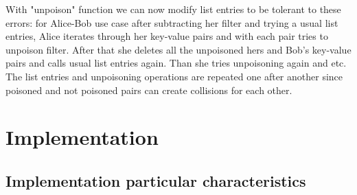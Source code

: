 \documentclass{article}
\begin{document}
With "unpoison" function we can now modify list entries to be tolerant to these 
errors: for Alice-Bob use case after subtracting her filter and trying a usual 
list entries, Alice iterates through her key-value pairs and with each pair tries
to unpoison filter. After that she deletes all the unpoisoned hers and Bob's 
key-value pairs and calls usual list entries again. Than she tries unpoisoning 
again and etc. The list entries and unpoisoning operations are repeated one 
after another since poisoned and not poisoned pairs can create collisions for 
each other.
\section{Implementation}
\subsection{Implementation particular characteristics}
\end{document}

